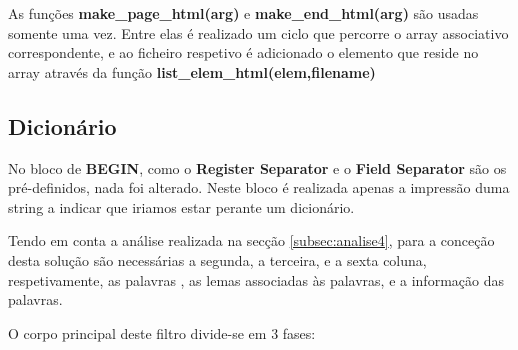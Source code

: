 \documentclass[11pt,a4paper]{report}
\begin{document}
As funções \textbf{make\_page\_html(arg)} e \textbf{make\_end\_html(arg)} são usadas somente uma vez. Entre elas é realizado um ciclo que percorre o array associativo correspondente, e ao ficheiro respetivo é adicionado o elemento que reside no array através da função \textbf{list\_elem\_html(elem,filename)}


\subsection{Dicionário}
\label{subsec:algoritmos4}

No bloco de \textbf{BEGIN}, como o \textbf{Register Separator} e o \textbf{Field Separator} são os pré-definidos, nada foi alterado. Neste bloco é realizada apenas a impressão duma string a indicar que iriamos estar perante um dicionário.

Tendo em conta a análise realizada na secção \ref{subsec:analise4}, para a conceção desta solução são necessárias a segunda, a terceira, e a sexta coluna, respetivamente, as palavras , as lemas associadas às palavras, e a informação das palavras.

O corpo principal deste filtro divide-se em 3 fases:
\end{document}
